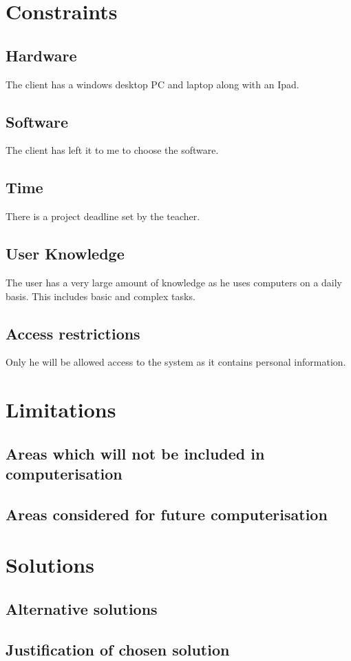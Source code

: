 \section{Constraints}

\subsection{Hardware}
The client has a windows desktop PC and laptop along with an Ipad.
\subsection{Software}
The client has left it to me to choose the software. 
\subsection{Time}
There is a project deadline set by the teacher. 
\subsection{User Knowledge}
The user has a very large amount of knowledge as he uses computers on a daily basis. This includes basic and complex tasks. 

\subsection{Access restrictions}
Only he will be allowed access to the system as it contains personal information. 

\section{Limitations}

\subsection{Areas which will not be included in computerisation}

\subsection{Areas considered for future computerisation}

\section{Solutions}

\subsection{Alternative solutions}

\subsection{Justification of chosen solution}